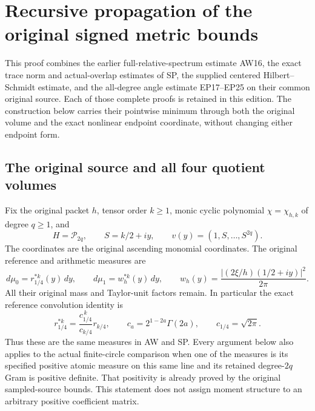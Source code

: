 \section{Recursive propagation of the original signed metric bounds}
\label{sec:recursive-metric-transport}

This proof combines the earlier full-relative-spectrum estimate AW16,
the exact trace norm and actual-overlap estimates of SP, the supplied
centered Hilbert--Schmidt estimate, and the all-degree angle estimate
EP17--EP25 on their common original source.  Each of those complete
proofs is retained in this edition.  The construction below carries
their pointwise minimum through both the original volume and the exact
nonlinear endpoint coordinate, without changing either endpoint form.

\subsection{The original source and all four quotient volumes}

Fix the original packet \(h\), tensor order \(k\geq1\), monic cyclic
polynomial \(\chi=\chi_{h,k}\) of degree \(q\geq1\), and
\[
 H=\mathcal P_{2q},\qquad S=k/2+iy,\qquad
 v(y)=(1,S,\ldots,S^{2q}).
 \tag{RMT1}
\]
The coordinates are the original ascending monomial coordinates.
The original reference and arithmetic measures are
\[
 d\mu_0=r_{1/4}^{*k}(y)\,dy,\qquad
 d\mu_1=w_h^{*k}(y)\,dy,\qquad
 w_h(y)=\frac{|(2\xi/h)(1/2+iy)|^2}{2\pi}.
 \tag{RMT2}
\]
All their original mass and Taylor-unit factors remain.  In particular
the exact reference convolution identity is
\[
 r_{1/4}^{*k}
 =\frac{c_{1/4}^{\,k}}{c_{k/4}}r_{k/4},\qquad
 c_a=2^{1-2a}\Gamma(2a),\qquad c_{1/4}=\sqrt{2\pi}.
 \tag{RMT3}
\]
Thus these are the same measures in AW and SP.  Every argument below
also applies to the actual finite-circle comparison when one of the
measures is its specified positive atomic measure on this same line
and its retained degree-\(2q\) Gram is positive definite.  That
positivity is already proved by the original sampled-source bounds.
This statement does not assign moment structure to an arbitrary
positive coefficient matrix.

